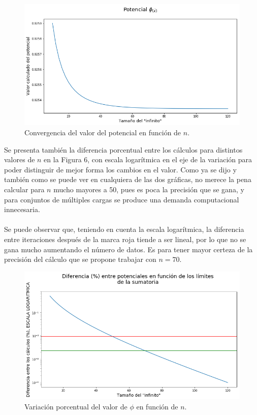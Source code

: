 \documentclass[12pt, notitlepage]{article}
\begin{document}
\begin{figure}[H]
\centering
\includegraphics[width=\linewidth]{./Imagenes/phi_n.png}
\caption{Convergencia del valor del potencial en función de $n$.}
\end{figure}
\noindent
Se presenta también la diferencia porcentual entre los cálculos para distintos valores de $n$ en la Figura 6, con escala logarítmica en el eje de la variación para poder distinguir de mejor forma los cambios en el valor. Como ya se dijo y también como se puede ver en cualquiera de las dos gráficas, no merece la pena calcular para $n$ mucho mayores a 50, pues es poca la precisión que se gana, y para conjuntos de múltiples cargas se produce una demanda computacional innecesaria.\\\\
Se puede observar que, teniendo en cuenta la escala logarítmica, la diferencia entre iteraciones después de la marca roja tiende a ser lineal, por lo que no se gana mucho aumentando el número de datos. Es para tener mayor certeza de la precisión del cálculo que se propone trabajar con $n = 70$. 
\begin{figure}[H]
\centering
\includegraphics[width=\linewidth]{./Imagenes/delta_n.png}
\caption{Variación porcentual del valor de $\phi$ en función de $n$.}
\end{figure}
\end{document}
